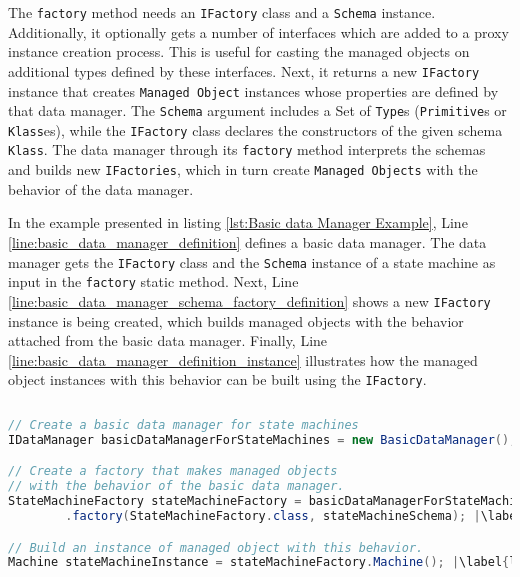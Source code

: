 The \texttt{factory} method needs an \texttt{IFactory} class and a \texttt{Schema} instance.
Additionally, it optionally gets a number of interfaces which are added to a proxy instance creation process.
This is useful for casting the managed objects on additional types defined by these interfaces.
Next, it returns a new \texttt{IFactory} instance that creates \texttt{Managed Object} instances whose properties are defined by that data manager.
The \texttt{Schema} argument includes a Set of \texttt{Type}s (\texttt{Primitive}s or \texttt{Klass}es), while the \texttt{IFactory} class declares the constructors of the given schema \texttt{Klass}.
The data manager through its \texttt{factory} method interprets the schemas and builds new \texttt{IFactories}, which in turn create \texttt{Managed Objects} with the behavior of the data manager.

In the example presented in listing \ref{lst:Basic data Manager Example}, Line \ref{line:basic_data_manager_definition} defines a basic data manager.
The data manager gets the \texttt{IFactory} class and the \texttt{Schema} instance of a state machine as input in the \texttt{factory} static method. 
Next, Line \ref{line:basic_data_manager_schema_factory_definition} shows a new \texttt{IFactory} instance is being created, which builds managed objects with the behavior attached from the basic data manager.
Finally, Line \ref{line:basic_data_manager_definition_instance} illustrates how the managed object instances with this behavior can be built using the \texttt{IFactory}.

\begin{sourcecode} [H]
	\begin{lstlisting}[language=Java, escapechar=|]
// Create a basic data manager for state machines
IDataManager basicDataManagerForStateMachines = new BasicDataManager(); |\label{line:basic_data_manager_definition}|

// Create a factory that makes managed objects 
// with the behavior of the basic data manager.
StateMachineFactory stateMachineFactory = basicDataManagerForStateMachines
		.factory(StateMachineFactory.class, stateMachineSchema); |\label{line:basic_data_manager_schema_factory_definition}|

// Build an instance of managed object with this behavior.
Machine stateMachineInstance = stateMachineFactory.Machine(); |\label{line:basic_data_manager_definition_instance}|
	\end{lstlisting}
	\caption{Basic data Manager Example}
	\label{lst:Basic data Manager Example}
\end{sourcecode}


